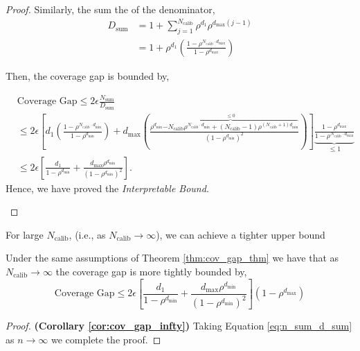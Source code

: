 \documentclass{l4dc2026}
\begin{document}
\begin{proof}
Similarly, the sum the of the denominator,
\begin{align}
    D_\text{sum} &= 1 + \sum_{j=1}^{N_\textrm{calib}} \rho^{d_1}\rho^{d_\text{max}(j-1)}\\
    &= 1 + \rho^{d_1} \left( \frac{1 - \rho^{N_\textrm{calib} \cdot d_\text{max}}}{1 - \rho^{d_\text{max}}} \right)
\end{align}

Then, the coverage gap is bounded by,
\begin{small}
\begin{align}
    &\text{Coverage Gap} \le 2\epsilon\frac{N_\text{sum}}{D_\text{sum}} \\
    &\le 2 \epsilon \left[{d_1 \left( \frac{1 - \rho^{N_\textrm{calib} \cdot d_\text{min}}}{1 - \rho^{d_\text{min}}} \right) +
    d_\text{max} \left( \frac{\rho^{d_\text{min}} \overbrace{- N_\textrm{calib} \rho^{N_\textrm{calib} \cdot d_\text{min}} + (N_\textrm{calib}-1)\rho^{(N_\textrm{calib}+1)d_\text{min}}}^{\leq 0}}{(1-\rho^{d_\text{min}})^2} \right)}\right]\underbrace{\frac{1 - \rho^{d_\text{max}}}{1 - \rho^{N_\textrm{calib} \cdot d_\text{max}}}}_{\leq 1}\label{eq:n_sum_d_sum}\\
    &\le 2 \epsilon \left[  \frac{d_1 }{1 - \rho^{d_\text{min}}} + \frac{d_\text{max}\rho^{d_\text{min}}}{(1-\rho^{d_\text{min}})^2}\right].\label{eq:final_bound} 
\end{align}
Hence, we have proved the \textit{Interpretable Bound}.
\end{small}
\end{proof}


For large $N_\textrm{calib}$, (i.e., as $N_\textrm{calib}\to\infty$), we can achieve a tighter upper bound
\begin{corollary}\label{cor:cov_gap_infty} Under the same assumptions of Theorem \ref{thm:cov_gap_thm} we have that as $N_\textrm{calib}\to \infty$ the coverage gap is more tightly bounded by,
\begin{equation}\text{Coverage Gap}\le 2\epsilon
\left[ \frac{d_1 }{1 - \rho^{d_\text{min}}} + \frac{d_\text{max}\rho^{d_\text{min}}}{(1-\rho^{d_\text{min}})^2}\right](1-\rho^{d_\text{max}})
\end{equation}
\end{corollary}

\begin{proof}\textbf{(Corollary \ref{cor:cov_gap_infty})}
Taking Equation \ref{eq:n_sum_d_sum} as $n\to\infty$ we complete the proof. 
\end{proof}
\end{document}
